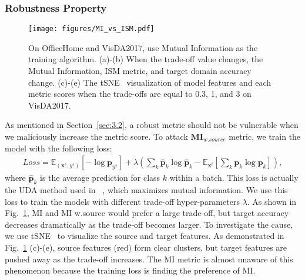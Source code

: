 \documentclass{article} %
\begin{document}
\subsubsection{Robustness Property}
\label{sec:3.3.2}

\begin{figure}[t]
\vspace{-6mm}
	\centering
	\texttt{[image: figures/MI\_vs\_ISM.pdf]}
	
    \caption{On OfficeHome and VisDA2017, use Mutual Information as the training algorithm. (a)-(b) When the trade-off value changes, the Mutual Information, ISM metric, and target domain accuracy change. (c)-(e) The tSNE~\cite{tSNE} visualization of model features and each metric scores when the trade-offs are equal to 0.3, 1, and 3 on VisDA2017.}
	\label{fig:conclusion-MI}
\vspace{-4mm}
\end{figure}

As mentioned in Section~\ref{sec:3.2}, a robust metric should not be vulnerable when we maliciously increase the metric score. To attack $\boldsymbol{MI}_{w. source}$ metric, we train the model with the following loss:
\begin{align}
 Loss = \mathbb{E}_{(\boldsymbol{x}^s,y^s)}[-\log \boldsymbol{p}_{y^s}]+\lambda (\sum_k \hat{\boldsymbol{p}}_k \log \hat{\boldsymbol{p}}_k-\mathbb{E}_{\boldsymbol{x}^t}[\sum_k \boldsymbol{p}_k \log \boldsymbol{p}_k]),
\end{align}
where $\hat{\boldsymbol{p}}_k$ is the average prediction for class $k$ within a batch. This loss is actually the UDA method used in ~\cite{MI}, which maximizes mutual information. We use this loss to train the models with different trade-off hyper-parameters $\lambda$.
As shown in Fig.~\ref{fig:conclusion-MI}, MI and MI w.source would prefer a large trade-off, but target accuracy decreases dramatically as the trade-off becomes larger. To investigate the cause, we use tSNE~\cite{tSNE} to visualize the source and target features. As demonstrated in Fig.~\ref{fig:conclusion-MI} (c)-(e), source features (red) form clear clusters, but target features are pushed away as the trade-off increases. The MI metric is almost unaware of this phenomenon because the training loss is finding the preference of MI.
\end{document}
